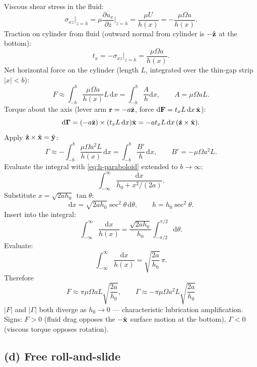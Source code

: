 \documentclass[11pt]{article}
\newcommand{\de}{\mathrm{d}}
\newcommand{\pd}[2]{\frac{\partial #1}{\partial #2}}
\begin{document}
Viscous shear stress in the fluid:
\[
\sigma_{xz}\big|_{z=h}=\mu\pd{u_x}{z}\bigg|_{z=h}=\frac{\mu U}{h(x)}=-\frac{\mu\Omega a}{h(x)}.
\]
Traction on cylinder from fluid (outward normal from cylinder is $-\hat{\vb z}$ at the bottom):
\[
t_x=-\sigma_{xz}\big|_{z=h}=\frac{\mu\Omega a}{h(x)}.
\]
Net horizontal force on the cylinder (length $L$, integrated over the thin-gap strip $|x|<b$):
\[
F\approx \int_{-b}^{b}\frac{\mu\Omega a}{h(x)}L\,\de x=\int_{-b}^{b}\frac{A}{h}\de x,\qquad A=\mu\Omega a L.
\]
Torque about the axis (lever arm $\vb r=-a\hat{\vb z}$, force $\de\vb F=t_x L\,\de x\,\hat{\vb x}$):
\[
\de\bm\Gamma=(-a\hat{\vb z})\times(t_x L\,\de x)\hat{\vb x}=-a t_x L\,\de x\,(\hat{\vb z}\times\hat{\vb x}).
\]
Apply $\hat{\vb z}\times\hat{\vb x}=\hat{\vb y}$:
\[
\Gamma\approx -\int_{-b}^{b}\frac{\mu\Omega a^2 L}{h(x)}\,\de x=\int_{-b}^{b}\frac{B'}{h}\,\de x,\qquad B'=-\mu\Omega a^2 L.
\]
Evaluate the integral with \eqref{eq:h-paraboloid} extended to $b\to\infty$:
\[
\int_{-\infty}^{\infty}\frac{\de x}{h_0+x^2/(2a)}.
\]
Substitute $x=\sqrt{2ah_0}\,\tan\theta$:
\[
\de x=\sqrt{2ah_0}\sec^2\theta\,\de\theta,\qquad h=h_0\sec^2\theta.
\]
Insert into the integral:
\[
\int_{-\infty}^{\infty}\frac{\de x}{h(x)}=\frac{\sqrt{2ah_0}}{h_0}\int_{-\pi/2}^{\pi/2}\de\theta.
\]
Evaluate:
\[
\int_{-\infty}^{\infty}\frac{\de x}{h(x)}=\sqrt{\frac{2a}{h_0}}\,\pi.
\]
Therefore
\begin{equation}
\boxed{\;F\approx \pi\mu\Omega aL\sqrt{\frac{2a}{h_0}},\qquad \Gamma\approx -\pi\mu\Omega a^2 L\sqrt{\frac{2a}{h_0}}\;}
\label{eq:F-Gamma}
\end{equation}
$|F|$ and $|\Gamma|$ both diverge as $h_0\to 0$ --- characteristic lubrication amplification. Signs: $F>0$ (fluid drag opposes the $-\hat{\vb x}$ surface motion at the bottom), $\Gamma<0$ (viscous torque opposes rotation).

\subsection*{(d) Free roll-and-slide}
\end{document}
